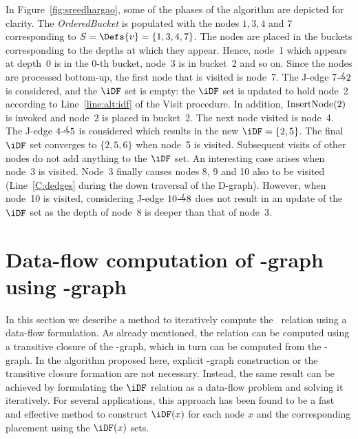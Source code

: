 {In Figure~\ref{fig:sreedhargao}, some of the phases of the algorithm are depicted for clarity. 
The \textit{OrderedBucket} is populated with the nodes $1,3,4$ and $7$ corresponding to $S=\Defs{v}=\{1,3,4,7\}$. 
The nodes are placed in the buckets corresponding to the depths at which they appear. 
Hence, node~1 which appears at depth~0 is in the 0-th bucket, node~3 is in bucket~2 and so on. 
Since the nodes are processed bottom-up, the first node that is visited is node~7. 
The J-edge $7 \st{J} 2$ is considered, and the $\iDF$ set is empty: the $\iDF$ 
set is updated to hold node~2 according to Line~\ref{line:alt:idf} of the Visit 
procedure.  In addition, $\textrm{InsertNode}(2)$ is invoked and node~2 is placed in 
bucket~2.  The next node visited is node~4.  The J-edge $4 \st{J} 5$ is 
considered which results in the new $\iDF = \{2,5\}$.  The final $\iDF$ set 
converges to $\{2,5,6\}$ when node~5 is visited.  Subsequent visits of other 
nodes do not add anything to the $\iDF$ set.  An interesting case arises when 
node~3 is visited.  Node~3 finally causes nodes 8, 9 and 10 also to be visited 
(Line~\ref{C:dedges} during the down traversal of the D-graph).  However, when 
node~10 is visited, considering J-edge $10 \st{J} 8$ does not result in an 
update of the $\iDF$ set as the depth of node~8 is deeper than that of node~3.


\section{Data-flow computation of \iDF-graph using \DJ-graph}

In this section we describe a method to iteratively compute the \iDF~relation using a data-flow formulation. 
As already mentioned, the \iDF relation can be computed using a transitive closure of the \DF-graph, which in turn can be computed from the \DJ-graph. 
In the algorithm proposed here, explicit \DF-graph construction or the transitive closure formation are not necessary. 
Instead, the same result can be achieved by formulating the $\iDF$ relation as a data-flow problem and solving it iteratively. 
For several applications, this approach has been found to be a fast and effective method to construct $\iDF(x)$ for each node $x$ and the corresponding \phifun placement using the $\iDF(x)$ sets.

}
